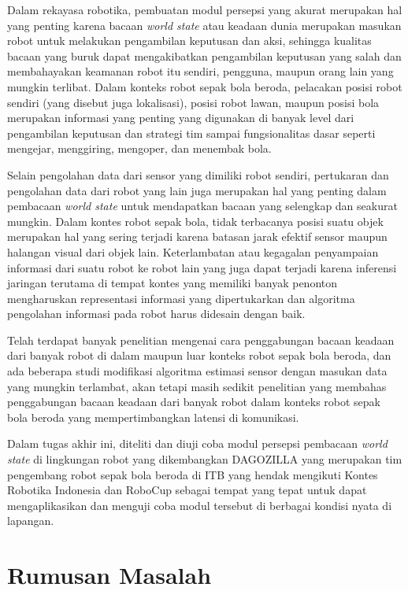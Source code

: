 Dalam rekayasa robotika, pembuatan modul persepsi yang akurat merupakan hal yang penting karena bacaan \textit{world state} atau keadaan dunia merupakan masukan robot untuk melakukan pengambilan keputusan dan aksi, sehingga kualitas bacaan yang buruk dapat mengakibatkan pengambilan keputusan yang salah dan membahayakan keamanan robot itu sendiri, pengguna, maupun orang lain yang mungkin terlibat. Dalam konteks robot sepak bola beroda, pelacakan posisi robot sendiri (yang disebut juga lokalisasi), posisi robot lawan, maupun posisi bola merupakan informasi yang penting yang digunakan di banyak level dari pengambilan keputusan dan strategi tim sampai fungsionalitas dasar seperti mengejar, menggiring, mengoper, dan menembak bola.

Selain pengolahan data dari sensor yang dimiliki robot sendiri, pertukaran dan pengolahan data dari robot yang lain juga merupakan hal yang penting dalam pembacaan \textit{world state} untuk mendapatkan bacaan yang selengkap dan seakurat mungkin. Dalam kontes robot sepak bola, tidak terbacanya posisi suatu objek merupakan hal yang sering terjadi karena batasan jarak efektif sensor maupun halangan visual dari objek lain. Keterlambatan atau kegagalan penyampaian informasi dari suatu robot ke robot lain yang juga dapat terjadi karena inferensi jaringan terutama di tempat kontes yang memiliki banyak penonton mengharuskan representasi informasi yang dipertukarkan dan algoritma pengolahan informasi pada robot harus didesain dengan baik.

Telah terdapat banyak penelitian mengenai cara penggabungan bacaan keadaan dari banyak robot di dalam maupun luar konteks robot sepak bola beroda, dan ada beberapa studi modifikasi algoritma estimasi sensor dengan masukan data yang mungkin terlambat, akan tetapi masih sedikit penelitian yang membahas penggabungan bacaan keadaan dari banyak robot dalam konteks robot sepak bola beroda yang mempertimbangkan latensi di komunikasi.

Dalam tugas akhir ini, diteliti dan diuji coba modul persepsi pembacaan \textit{world state} di lingkungan robot yang dikembangkan DAGOZILLA yang merupakan tim pengembang robot sepak bola beroda di ITB yang hendak mengikuti Kontes Robotika Indonesia dan RoboCup sebagai tempat yang tepat untuk dapat mengaplikasikan dan menguji coba modul tersebut di berbagai kondisi nyata di lapangan.

\section{Rumusan Masalah}

